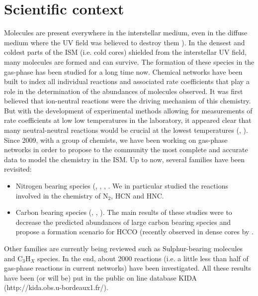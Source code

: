 \section{Scientific context} 

Molecules are present everywhere in the interstellar medium, even in the diffuse medium where the UV field was believed to destroy them \citep[see for instance][]{2012ApJ...753L..28L}). In the densest and coldest parts of the ISM (i.e. cold cores) shielded from the interstellar UV field, many molecules are formed and can survive. The formation of these species in the gas-phase has been studied for a long time now. Chemical networks have been built to index all individual reactions and associated rate coefficients that play a role in the determination of the abundances of molecules observed. It was first believed that ion-neutral reactions were the driving mechanism of this chemistry. But with the development of experimental methods allowing for measurements of rate coefficients at low low temperatures in the laboratory, it appeared clear that many neutral-neutral reactions would be crucial at the lowest temperatures (\cite{2010SSRv..156...13W}, \cite{Smith_2011}). Since 2009, with a group of chemists, we have been working on gas-phase networks in order to propose to the community the most complete and accurate data to model the chemistry in the ISM. Up to now, several families have been revisited: 
\begin{itemize}
\item{Nitrogen bearing species (\cite{2013PCCP...1513888D}, \cite{2012PNAS..10910233D}, \cite{2014MNRAS.443..398L}, \cite{2013arXiv1310.4350W}. We in particular studied the reactions involved in the chemistry of N$_2$, HCN and HNC.} 
\item{Carbon bearing species (\cite{Wakelam_2009}, \cite{2014MNRAS.437..930L}, \cite{2015MNRAS.453L..48W}). The main results of these studies were to decrease the predicted abundances of large carbon bearing species and propose a formation scenario for HCCO (recently observed in dense cores by \cite{Ag_ndez_2015}.} 
\end{itemize}
Other families are currently being reviewed such as Sulphur-bearing molecules and C$_3$H$_X$ species. In the end, about 2000 reactions (i.e. a little less than half of gas-phase reactions in current networks) have been investigated. All these results have been (or will be) put in the public on line database KIDA (http://kida.obs.u-bordeaux1.fr/). \\
